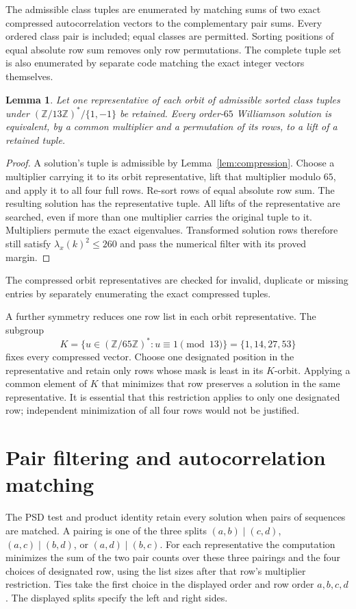 \documentclass[11pt]{article}
\newtheorem{lemma}[theorem]{Lemma}
\newcommand{\Z}{\mathbb Z}
\begin{document}
The admissible class tuples are enumerated by matching sums of two exact
compressed autocorrelation vectors to the complementary pair sums.
Every ordered class pair is included; equal classes are permitted.
Sorting positions of equal absolute row sum removes only row permutations.
The complete tuple set is also enumerated by separate code matching the
exact integer vectors themselves.

\begin{lemma}\label{lem:cover}
Let one representative of each orbit of admissible sorted class tuples
under $(\Z/13\Z)^*/\{1,-1\}$ be retained. Every order-$65$ Williamson
solution is equivalent, by a common multiplier and a permutation of its
rows, to a lift of a retained tuple.
\end{lemma}
\begin{proof}
A solution's tuple is admissible by Lemma~\ref{lem:compression}.
Choose a multiplier carrying it to its orbit representative, lift that
multiplier modulo $65$, and apply it to all four full rows. Re-sort rows
of equal absolute row sum. The resulting solution has the representative
tuple. All lifts of the representative are searched, even if more than one
multiplier carries the original tuple to it. Multipliers permute the exact
eigenvalues. Transformed solution rows therefore still satisfy
$\lambda_x(k)^2\leq260$ and pass the numerical filter with its proved
margin.
\end{proof}
The compressed orbit representatives are checked for invalid, duplicate
or missing entries by separately enumerating the exact compressed tuples.

A further symmetry reduces one row list in each orbit representative. The subgroup
\[
 K=\{u\in(\Z/65\Z)^*:u\equiv1\pmod{13}\}=\{1,14,27,53\}
\]
fixes every compressed vector. Choose one designated position in the representative
and retain only rows whose mask is least in its $K$-orbit.
Applying a common element of $K$ that minimizes that row preserves a
solution in the same representative. It is essential that this restriction applies
to only one designated row; independent minimization of all four rows
would not be justified.

\section{Pair filtering and autocorrelation matching}\label{sec:join}
The PSD test and product identity retain every solution when pairs of
sequences are matched. A pairing is one of the three splits
$(a,b)\mid(c,d)$, $(a,c)\mid(b,d)$, or $(a,d)\mid(b,c)$.
For each representative the computation minimizes the sum of the two pair
counts over these three pairings and the four choices of designated row,
using the list sizes after that row's multiplier restriction. Ties take
the first choice in the displayed order and row order $a,b,c,d$.
The displayed splits specify the left and right sides.
\end{document}

